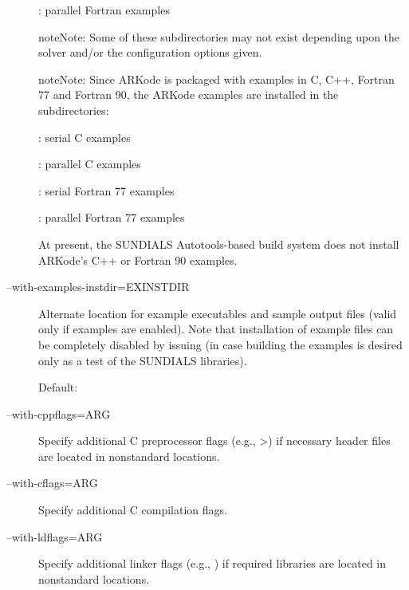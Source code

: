 \documentclass[letterpaper,10pt,english]{sphinxmanual}
\begin{document}
\begin{description}
: parallel Fortran
examples

\begin{notice}{note}{Note:}
Some of these subdirectories may not exist depending upon
the solver and/or the configuration options given.
\end{notice}

\begin{notice}{note}{Note:}
Since ARKode is packaged with examples in C, C++, Fortran 77
and Fortran 90, the ARKode examples are installed in the
subdirectories:

: serial C examples

: parallel C examples

: serial Fortran 77 examples

: parallel
Fortran 77 examples

At present, the SUNDIALS Autotools-based build system
does not install ARKode's C++ or Fortran 90 examples.
\end{notice}

\item[{\index{--with-examples-instdir=EXINSTDIR (autotools option)}--with-examples-instdir=EXINSTDIR}] \leavevmode
Alternate location for example executables and sample output files
(valid only if examples are enabled). Note that installation of
example files can be completely disabled by issuing
 (in case building the examples is desired only as
a test of the SUNDIALS libraries).

Default: 

\item[{\index{--with-cppflags=ARG (autotools option)}--with-cppflags=ARG}] \leavevmode
Specify additional C preprocessor flags (e.g.,
\textgreater{}) if necessary header files are
located in nonstandard locations.

\item[{\index{--with-cflags=ARG (autotools option)}--with-cflags=ARG}] \leavevmode
Specify additional C compilation flags.

\item[{\index{--with-ldflags=ARG (autotools option)}--with-ldflags=ARG}] \leavevmode
Specify additional linker flags (e.g.,
) if required libraries are located in
nonstandard locations.


\end{description}
\end{document}
